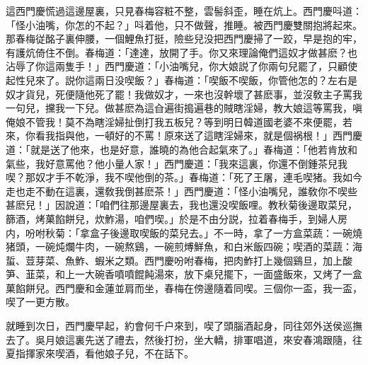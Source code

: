 這西門慶慌過這邊屋裏，只見春梅容粧不整，雲髻斜歪，睡在炕上。西門慶呌道：「怪小油嘴，你怎的不起？」呌着他，只不做聲，推睡。被西門慶雙關抱將起來。那春梅従酩子裏伸腰，一個鯉魚打挺，險些兒没把西門慶掃了一跤，早是抱的牢，有護炕倚住不倒。春梅道：「達達，放開了手。你又來理論俺們這奴才做甚麽？也沾辱了你這兩隻手！」西門慶道：「小油嘴兒，你大娘説了你兩句兒罷了，只顧使起性兒來了。説你這兩日没喫飯？」春梅道：「喫飯不喫飯，你管他怎的？左右是奴才貨兒，死便隨他死了罷！我做奴才，一來也沒幹壞了甚麽事，並沒敎主子罵我一句兒，攩我一下兒。做甚麽為這㒲遍街搗遍巷的賊瞎淫婦，教大娘這等罵我，嗔俺娘不管我！莫不為瞎淫婦扯倒打我五板兒？等到明日韓道國老婆不來便罷，若來，你看我指與他，一頓好的不罵！原來送了這瞎淫婦來，就是個祸根！」西門慶道：「就是送了他來，也是好意，誰曉的為他合起氣來了。」春梅道：「他若肯放和氣些，我好意罵他？他小量人家！」西門慶道：「我來這裏，你還不倒鍾茶兒我喫？那奴才手不乾淨，我不喫他倒的茶。」春梅道：「死了王屠，連毛喫猪。我如今走也走不動在這裏，還敎我倒甚麽茶！」西門慶道：「怪小油嘴兒，誰敎你不喫些甚麽兒！」因說道：「咱們往那邊屋裏去，我也還没喫飯哩。教秋菊後邊取菜兒，篩酒，烤菓餡餅兒，炊鮓湯，咱們喫。」於是不由分説，拉着春梅手，到婦人房内，吩咐秋菊：「拿盒子後邊取喫飯的菜兒去。」不一時，拿了一方盒菜蔬：一碗燒猪頭，一碗炖爛牛肉，一碗熬鷄，一碗煎煿鮮魚，和白米飯四碗；喫酒的菜蔬：海蜇、荳芽菜、魚鮓、蝦米之類。西門慶吩咐春梅，把肉鮓打上幾個鷄旦，加上酸笋、韮菜，和上一大碗香噴噴餛飩湯來，放下桌兒擺下，一面盛飯來，又烤了一盒菓餡餅兒。西門慶和金蓮並肩而坐，春梅在傍邊隨着同喫。三個你一盃，我一盃，喫了一更方散。

就睡到次日，西門慶早起，約會何千户來到，喫了頭腦酒起身，同往郊外送侯巡撫去了。吳月娘這裏先送了禮去，然後打扮，坐大轎，排軍唱道，來安春鴻跟隨，往夏指揮家來喫酒，看他娘子兒，不在話下。

